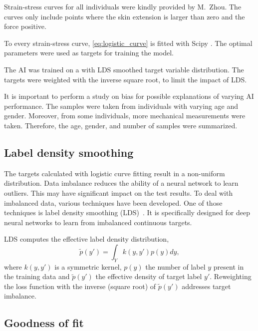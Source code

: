 Strain-stress curves for all individuals were kindly provided by M.\ Zhou.
The curves only include points where the skin extension is larger than zero and the force positive.

To every strain-stress curve, \cref{eq:logistic_curve} is fitted with Scipy .
The optimal parameters were used as targets for training the model.

The AI was trained on a with LDS smoothed target variable distribution.
The targets were weighted with the inverse square root, to limit the impact of LDS.

It is important to perform a study on bias for possible explanations of varying AI performance.
The samples were taken from individuals with varying age and gender.
Moreover, from some individuals, more mechanical measurements were taken.
Therefore, the age, gender, and number of samples were summarized.


\subsection{Label density smoothing}
The targets calculated with logistic curve fitting result in a non-uniform distribution.
Data imbalance reduces the ability of a neural network to learn outliers.
This may have significant impact on the test results.
To deal with imbalanced data, various techniques have been developed.
One of those techniques is label density smoothing (LDS)~.
It is specifically designed for deep neural networks to learn from imbalanced continuous targets.

\newcommand{\edtl}{$\tilde{p}(y')$ }
LDS computes the effective label density distribution,
\begin{equation}
    \tilde{p}(y') = \int_Y k(y, y')p(y)dy,
\end{equation}
where $k(y,y')$ is a symmetric kernel, $p(y)$ the number of label $y$ present in the training data and \edtl the effective density of target label $y'$.
Reweighting the loss function with the inverse (square root) of \edtl addresses target imbalance.

\subsection{Goodness of fit}

